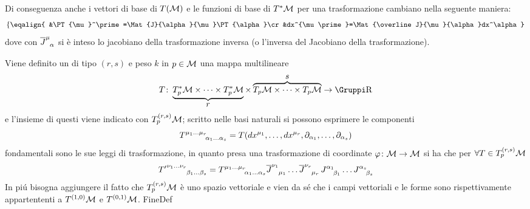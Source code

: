 Di conseguenza anche i vettori di base di $T({\cal M})$ e le funzioni di base di $T^\ast{\cal M}$ per una trasformazione cambiano nella seguente maniera:
$$
\left\{\eqalign{
&\PT{\mu}^\prime=\Mat{J}{\alpha}{\mu}\PT{\alpha}\cr
&dx^{\mu\prime}=\Mat{\overline J}{\mu}{\alpha}dx^\alpha
}\right.
$$
dove con $\Mat{\overline J}{\mu}{\alpha}$ si \`e inteso lo jacobiano della trasformazione inversa (o l'inversa del Jacobiano della trasformazione).
\par
{}
Viene definito un  di tipo $(r,s)$ e peso $k$ in $p\in{\cal M}$ una mappa multilineare
$$
T\colon\underbrace{T_p^\ast\MM\times\dots\times T_p^\ast\MM}_{\textstyle r}\times\overbrace{T_p\MM\times\dots\times T_p\MM}^{\textstyle s}\to\RN{}
$$
e l'insieme di questi viene indicato con $T_p^{(r,s)}{\cal M}$; scritto nelle basi naturali si possono esprimere le componenti
$$
\Mat{T}{\mu_1\dots\mu_r}{\alpha_1\dots\alpha_s}=T(dx^{\mu_1},\dots,dx^{\mu_r},\PT{\alpha_1},\dots,\PT{\alpha_s})
$$
fondamentali sono le sue leggi di trasformazione, in quanto presa una trasformazione di coordinate $\varphi\colon{\cal M}\to{\cal M}$ si ha che per $\forall T\in T_p^{(r,s)}{\cal M}$
$$
\Mat{T^{\prime}}{\nu_1\dots\nu_r}{\beta_1\dots\beta_s}=\Mat{T}{\mu_1\dots\mu_r}{\alpha_1\dots\alpha_s}\Mat{\overline J}{\nu_1}{\mu_1}\dots\Mat{\overline J}{\nu_r}{\mu_r}\,\Mat{J}{\alpha_1}{\beta_1}\dots\Mat{J}{\alpha_s}{\beta_s}
$$ 
In pi\'u bisogna aggiungere il fatto che $T_p^{(r,s)}{\cal M}$ \`e uno spazio vettoriale e vien da s\'e che i campi vettoriali e le forme sono rispettivamente appartententi a $T^{(1,0)}{\cal M}$ e $T^{(0,1)}{\cal M}$.
FineDef


